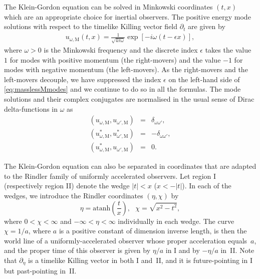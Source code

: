 The Klein-Gordon equation can be solved in Minkowski coordinates
$(t,x)$ which are an appropriate choice for inertial observers. The
positive energy mode solutions with respect to the timelike Killing
vector field $\partial_t$ are given by
\begin{align}
\label{eq:masslessMmodes}
u_{\omega,\text{M}} (t,x) = \frac{1}{\sqrt{4\pi \omega}}
\exp[-i\omega(t-\epsilon x)],
\end{align}
where $\omega>0$ is the Minkowski frequency and the discrete index $\epsilon$ 
takes the value $1$ for modes with positive momentum (the right-movers) 
and the value $-1$ for modes with negative momentum (the left-movers). 
As the right-movers and the left-movers decouple, we have suppressed the index $\epsilon$ on the left-hand side of \eqref{eq:masslessMmodes} and we continue to do so in all the formulas. The mode solutions and their complex conjugates are normalised in the usual sense of Dirac delta-functions in $\omega$ as 
\begin{eqnarray}
\left(u_{\omega,\text{M}},  u_{\omega',\text{M}}\right)& =& 
\delta_{\omega\omega'},\nonumber\\
\left(u^{\ast}_{\omega,\text{M}},  u^{\ast}_{\omega',\text{M}}\right)& =& 
- \delta_{\omega\omega'} ,\nonumber\\ 
\left(u^{\ast}_{\omega,\text{M}},  u_{\omega',\text{M}}\right)& =& 0.
\end{eqnarray}


The Klein-Gordon equation can also be separated in coordinates
that are adapted to the Rindler family of 
uniformly accelerated observers. 
Let region I (respectively region II) denote the wedge $|t|<x$ 
($x<-|t|$). In each of the wedges, we introduce the Rindler
coordinates $(\eta,\chi)$ by \cite{Takagi} 
\begin{equation}
\label{Rindlertransformation}
\eta = \text{atanh} \! \left(\frac{t}{x}\right), 
~~~\chi = \sqrt{x^2-t^2},
\end{equation}
where $0<\chi<\infty$ and $-\infty < \eta < \infty$ individually in each
wedge. The curve $\chi = 1/a$, where $a$ is a positive constant
of dimension inverse length, is then the world line of a
uniformly-accelerated observer whose proper acceleration equals~$a$,
and the proper time of this observer is given by $\eta/a$ in I and by
$-\eta/a$ in~II\null.  Note that $\partial_\eta$ is a timelike Killing
vector in both I and~II, and it is future-pointing in I but
past-pointing in~II\null.

